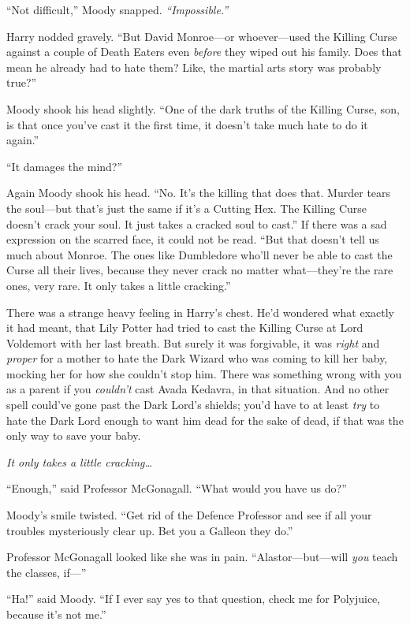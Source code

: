 ``Not difficult,'' Moody snapped. \emph{``Impossible.''}

Harry nodded gravely. ``But David Monroe---or whoever---used the Killing
Curse against a couple of Death Eaters even \emph{before} they wiped out
his family. Does that mean he already had to hate them? Like, the
martial arts story was probably true?''

Moody shook his head slightly. ``One of the dark truths of the Killing
Curse, son, is that once you've cast it the first time, it doesn't take
much hate to do it again.''

``It damages the mind?''

Again Moody shook his head. ``No. It's the killing that does that.
Murder tears the soul---but that's just the same if it's a Cutting Hex.
The Killing Curse doesn't crack your soul. It just takes a cracked soul
to cast.'' If there was a sad expression on the scarred face, it could
not be read. ``But that doesn't tell us much about Monroe. The ones like
Dumbledore who'll never be able to cast the Curse all their lives,
because they never crack no matter what---they're the rare ones, very
rare. It only takes a little cracking.''

There was a strange heavy feeling in Harry's chest. He'd wondered what
exactly it had meant, that Lily Potter had tried to cast the Killing
Curse at Lord Voldemort with her last breath. But surely it was
forgivable, it was \emph{right} and \emph{proper} for a mother to hate
the Dark Wizard who was coming to kill her baby, mocking her for how she
couldn't stop him. There was something wrong with you as a parent if you
\emph{couldn't} cast Avada Kedavra, in that situation. And no other
spell could've gone past the Dark Lord's shields; you'd have to at least
\emph{try} to hate the Dark Lord enough to want him dead for the sake of
dead, if that was the only way to save your baby.

\emph{It only takes a little cracking\ldots{}}

``Enough,'' said Professor McGonagall. ``What would you have us do?''

Moody's smile twisted. ``Get rid of the Defence Professor and see if all
your troubles mysteriously clear up. Bet you a Galleon they do.''

Professor McGonagall looked like she was in pain. ``Alastor---but---will
\emph{you} teach the classes, if---''

``Ha!'' said Moody. ``If I ever say yes to that question, check me for
Polyjuice, because it's not me.''

